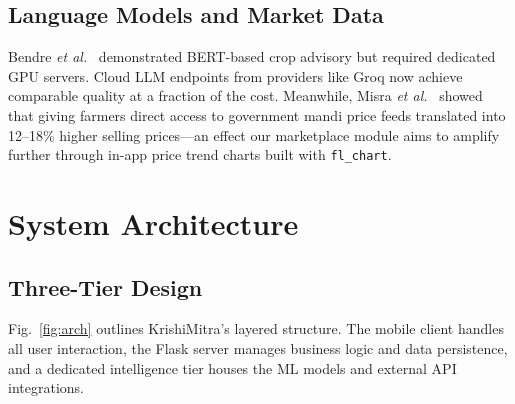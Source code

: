 \documentclass[conference]{IEEEtran}
\begin{document}
\subsection{Language Models and Market Data}
Bendre \textit{et al.}~\cite{bendre2021} demonstrated
BERT-based crop advisory but required dedicated GPU servers. Cloud LLM endpoints from providers like
Groq now achieve comparable quality at a fraction of the cost. Meanwhile, Misra \textit{et
al.}~\cite{misra2023} showed that giving farmers direct access to government mandi price feeds
translated into 12--18\% higher selling prices---an effect our marketplace module aims to amplify
further through in-app price trend charts built with \texttt{fl\_chart}.

\section{System Architecture}

\subsection{Three-Tier Design}
Fig.~\ref{fig:arch} outlines KrishiMitra's layered structure. The
mobile client handles all user interaction, the Flask server manages business logic and data
persistence, and a dedicated intelligence tier houses the ML models and external API integrations.
\end{document}
